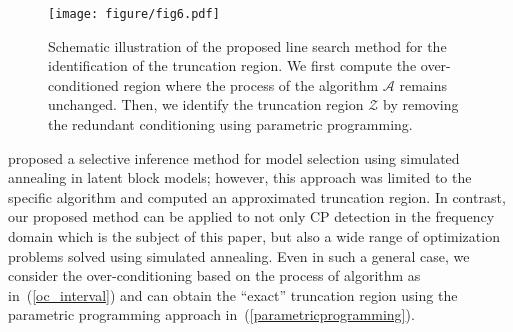 \begin{figure}[H]
  \centering
  \texttt{[image: figure/fig6.pdf]}
  \caption{
            Schematic illustration of the proposed line search method for the identification of the truncation region.
            We first compute the over-conditioned region where the process of the algorithm $\mathcal{A}$ remains unchanged. 
            Then, we identify the truncation region $\mathcal{Z}$ by removing the redundant conditioning using parametric programming.
           }
  \label{fig6}
\end{figure}

\citet{watanabe2021selective} proposed a selective inference method for model selection using simulated annealing in latent block models; 
however, this approach was limited to the specific algorithm and computed an approximated truncation region. 
In contrast, our proposed method can be applied to not only CP detection in the frequency domain which is the subject of this paper, 
but also a wide range of optimization problems solved using simulated annealing.
Even in such a general case, we consider the over-conditioning based on the process of algorithm as in~(\ref{oc_interval}) 
and can obtain the ``exact'' truncation region using the parametric programming approach in~(\ref{parametricprogramming}).
